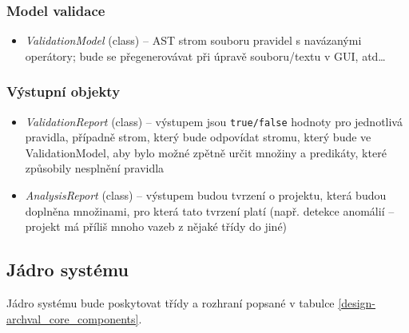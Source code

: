 \subsubsection{Model validace}
\begin{itemize}
\item \emph{ValidationModel} (class) -- AST strom souboru pravidel s navázanými operátory; bude se přegenerovávat při úpravě souboru/textu v GUI, atd\ldots
\end{itemize}

\subsubsection{Výstupní objekty}
\begin{itemize}
\item \emph{ValidationReport} (class) -- výstupem jsou \verb+true/false+ hodnoty pro jednotlivá pravidla, případně strom, který bude odpovídat stromu, který bude ve ValidationModel, aby bylo možné zpětně určit množiny a predikáty, které způsobily nesplnění pravidla
\item \emph{AnalysisReport} (class) -- výstupem budou tvrzení o projektu, která budou doplněna množinami, pro která tato tvrzení platí (např. detekce anomálií -- projekt má příliš mnoho vazeb z nějaké třídy do jiné)
\end{itemize}

\subsection{Jádro systému}
Jádro systému bude poskytovat třídy a rozhraní popsané v tabulce \ref{design-archval_core_components}.

